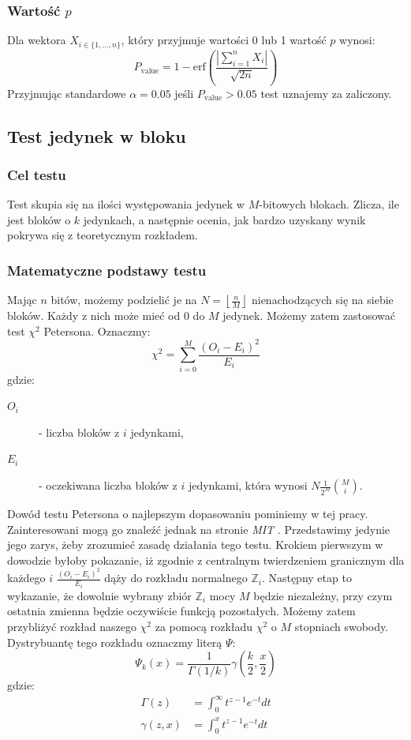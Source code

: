 \subsubsection{Wartość $p$}
Dla wektora $X_{i \in \{1, \dots, n\}}$, który przyjmuje wartości 0 lub 1 wartość $p$ wynosi:
\begin{equation}
    P_{\textrm{value}} = 1 - \textrm{erf}\left(\frac{|\sum_{i = 1}^nX_i|}{\sqrt{2n}}\right)
\end{equation}
Przyjmując standardowe $\alpha = 0.05$ jeśli $P_{\textrm{value}} > 0.05$ test uznajemy za zaliczony.
\subsection{Test jedynek w bloku}
\subsubsection{Cel testu}
Test skupia się na ilości występowania jedynek w $M$-bitowych blokach. Zlicza, ile jest bloków o $k$ jedynkach, a następnie ocenia, jak bardzo uzyskany wynik pokrywa się z teoretycznym rozkładem.
\subsubsection{Matematyczne podstawy testu}
Mając $n$ bitów, możemy podzielić je na $N=\left \lfloor{\frac{n}{M}}\right \rfloor$ nienachodzących się na siebie bloków. Każdy z nich może mieć od 0 do $M$ jedynek. Możemy zatem zastosować test $\chi^2$ Petersona. Oznaczmy:
\begin{equation}
    \chi^2 = \sum_{i=0}^M{\frac{(O_i-E_i)^2}{E_i}}
\end{equation}
gdzie:
\begin{description}
    \item[$O_i$] - liczba bloków z $i$ jedynkami,
    \item[$E_i$] - oczekiwana liczba bloków z $i$ jedynkami, która wynosi $N\frac{1}{2^M}{M \choose i}$. 
\end{description}
Dowód testu Petersona o najlepszym dopasowaniu pominiemy w tej pracy. Zainteresowani mogą go znaleźć jednak na stronie \emph{MIT} \cite{Chi_squared}. Przedstawimy jedynie jego zarys, żeby zrozumieć zasadę działania tego testu. Krokiem pierwszym w dowodzie byłoby pokazanie, iż zgodnie z centralnym twierdzeniem granicznym dla każdego $i$ $\frac{(O_i-E_i)^2}{E_i}$ dąży do rozkładu normalnego $\mathbb{Z}_i$. Następny etap to wykazanie, że dowolnie wybrany zbiór $\mathbb{Z}_i$ mocy $M$ będzie niezależny, przy czym ostatnia zmienna będzie oczywiście funkcją pozostałych. Możemy zatem przybliżyć rozkład naszego $\chi^2$ za pomocą rozkładu $\chi^2$ o $M$ stopniach swobody. Dystrybuantę tego rozkładu oznaczmy literą $\Psi$:
\begin{equation}
    \Psi_k(x) = \frac{1}{\Gamma(1/k)}\gamma\left(\frac{k}{2}, \frac{x}{2}\right)
\end{equation}
gdzie:
\begin{equation}
\begin{split}
    \Gamma(z) &= \int_0^\infty t^{z-1}e^{-t}dt\\
    \gamma(z,x) &= \int_0^x t^{z-1}e^{-t}dt
\end{split}
\end{equation}
